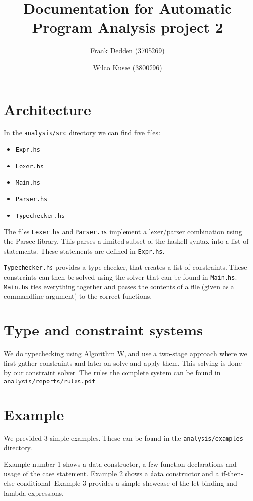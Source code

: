 \documentclass[10pt]{article}
\title{Documentation for Automatic Program Analysis project 2}
\author{Frank Dedden (3705269) \and Wilco Kusee (3800296)}
\begin{document}
\maketitle

\section{Architecture}
In the \texttt{analysis/src} directory we can find five files:
\begin{itemize}
	\item \texttt{Expr.hs}
	\item \texttt{Lexer.hs}
	\item \texttt{Main.hs}
	\item \texttt{Parser.hs}
	\item \texttt{Typechecker.hs}
\end{itemize}
The files \texttt{Lexer.hs} and \texttt{Parser.hs} implement a lexer/parser combination using the Parsec library. This parses a limited subset of the haskell syntax into a list of statements. These statements are defined in \texttt{Expr.hs}.

\texttt{Typechecker.hs} provides a type checker, that creates a list of constraints. These constraints can then be solved using the solver that can be found in \texttt{Main.hs}. \texttt{Main.hs} ties everything together and passes the contents of a file (given as a commandline argument) to the correct functions.

\section{Type and constraint systems}
We do typechecking using Algorithm W, and use a two-stage approach where we first gather constraints and later on solve and apply them. This solving is done by our constraint solver. The rules the complete system can be found in \texttt{analysis/reports/rules.pdf}

\section{Example}
We provided 3 simple examples. These can be found in the \texttt{analysis/examples} directory.

Example number 1 shows a data constructor, a few function declarations and usage of the case statement. Example 2 shows a data constructor and a if-then-else conditional. Example 3 provides a simple showcase of the let binding and lambda expressions.
\end{document}
